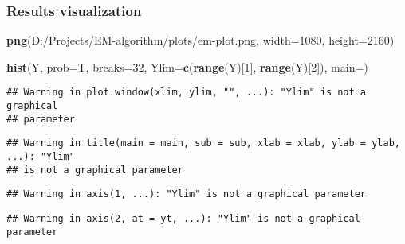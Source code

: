 \documentclass[
]{article}
\newenvironment{Shaded}{\begin{snugshade}}{\end{snugshade}}
\newcommand{\AttributeTok}[1]{\textcolor[rgb]{0.13,0.29,0.53}{#1}}
\newcommand{\DecValTok}[1]{\textcolor[rgb]{0.00,0.00,0.81}{#1}}
\newcommand{\FunctionTok}[1]{\textcolor[rgb]{0.13,0.29,0.53}{\textbf{#1}}}
\newcommand{\NormalTok}[1]{#1}
\newcommand{\StringTok}[1]{\textcolor[rgb]{0.31,0.60,0.02}{#1}}
\begin{document}
\subsubsection{Results visualization}\label{results-visualization}

\begin{Shaded}
\begin{Highlighting}[]
\FunctionTok{png}\NormalTok{(}\StringTok{\textquotesingle{}D:/Projects/EM{-}algorithm/plots/em{-}plot.png\textquotesingle{}}\NormalTok{, }\AttributeTok{width=}\DecValTok{1080}\NormalTok{, }\AttributeTok{height=}\DecValTok{2160}\NormalTok{)}

\FunctionTok{hist}\NormalTok{(Y, }\AttributeTok{prob=}\NormalTok{T, }\AttributeTok{breaks=}\DecValTok{32}\NormalTok{, }\AttributeTok{Ylim=}\FunctionTok{c}\NormalTok{(}\FunctionTok{range}\NormalTok{(Y)[}\DecValTok{1}\NormalTok{], }\FunctionTok{range}\NormalTok{(Y)[}\DecValTok{2}\NormalTok{]), }\AttributeTok{main=}\StringTok{\textquotesingle{}\textquotesingle{}}\NormalTok{)}
\end{Highlighting}
\end{Shaded}

\begin{verbatim}
## Warning in plot.window(xlim, ylim, "", ...): "Ylim" is not a graphical
## parameter
\end{verbatim}

\begin{verbatim}
## Warning in title(main = main, sub = sub, xlab = xlab, ylab = ylab, ...): "Ylim"
## is not a graphical parameter
\end{verbatim}

\begin{verbatim}
## Warning in axis(1, ...): "Ylim" is not a graphical parameter
\end{verbatim}

\begin{verbatim}
## Warning in axis(2, at = yt, ...): "Ylim" is not a graphical parameter
\end{verbatim}
\end{document}
